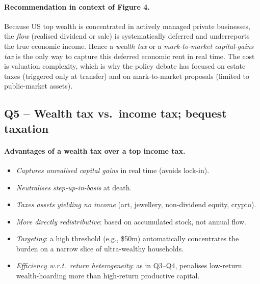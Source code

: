 \documentclass[11pt,a4paper]{article}
\begin{document}
\paragraph{Recommendation in context of Figure 4.}
Because US top wealth is concentrated in actively managed private businesses, the \emph{flow} (realised dividend or sale) is systematically deferred and underreports the true economic income. Hence a \emph{wealth tax} or a \emph{mark-to-market capital-gains tax} is the only way to capture this deferred economic rent in real time. The cost is valuation complexity, which is why the policy debate has focused on estate taxes (triggered only at transfer) and on mark-to-market proposals (limited to public-market assets).

\subsection*{Q5 -- Wealth tax vs.\ income tax; bequest taxation}

\paragraph{Advantages of a wealth tax over a top income tax.}
\begin{itemize}[leftmargin=*,itemsep=1pt]
    \item \emph{Captures unrealised capital gains} in real time (avoids lock-in).
    \item \emph{Neutralises step-up-in-basis} at death.
    \item \emph{Taxes assets yielding no income} (art, jewellery, non-dividend equity, crypto).
    \item \emph{More directly redistributive}: based on accumulated stock, not annual flow.
    \item \emph{Targeting}: a high threshold (e.g., \$50m) automatically concentrates the burden on a narrow slice of ultra-wealthy households.
    \item \emph{Efficiency w.r.t.\ return heterogeneity}: as in Q3--Q4, penalises low-return wealth-hoarding more than high-return productive capital.
\end{itemize}
\end{document}
